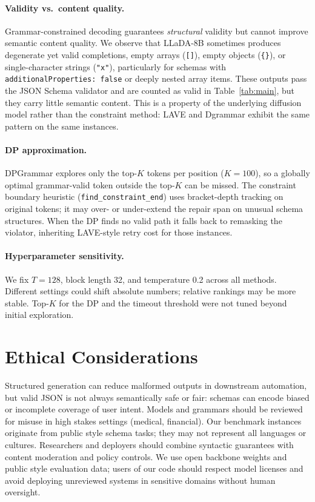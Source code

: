 \paragraph{Validity vs.\ content quality.}
Grammar-constrained decoding guarantees \emph{structural} validity but cannot improve semantic content quality.
We observe that LLaDA-8B sometimes produces degenerate yet valid completions, empty arrays (\texttt{[]}), empty objects (\texttt{\{\}}), or single-character strings (\texttt{"x"}), particularly for schemas with \texttt{additionalProperties:~false} or deeply nested array items.
These outputs pass the JSON Schema validator and are counted as valid in Table~\ref{tab:main}, but they carry little semantic content.
This is a property of the underlying diffusion model rather than the constraint method: LAVE and Dgrammar exhibit the same pattern on the same instances.

\paragraph{DP approximation.}
DPGrammar explores only the top-$K$ tokens per position ($K{=}100$), so a globally optimal grammar-valid token outside the top-$K$ can be missed.
The constraint boundary heuristic (\texttt{find\_constraint\_end}) uses bracket-depth tracking on original tokens; it may over- or under-extend the repair span on unusual schema structures.
When the DP finds no valid path it falls back to remasking the violator, inheriting LAVE-style retry cost for those instances.

\paragraph{Hyperparameter sensitivity.}
We fix $T{=}128$, block length 32, and temperature 0.2 across all methods.
Different settings could shift absolute numbers; relative rankings may be more stable.
Top-$K$ for the DP and the timeout threshold were not tuned beyond initial exploration.

\section{Ethical Considerations}

Structured generation can reduce malformed outputs in downstream automation, but valid JSON is not always semantically safe or fair: schemas can encode biased or incomplete coverage of user intent. Models and grammars should be reviewed for misuse in high stakes settings (medical, financial). Our benchmark instances originate from public style schema tasks; they may not represent all languages or cultures. Researchers and deployers should combine syntactic guarantees with content moderation and policy controls. We use open backbone weights and public style evaluation data; users of our code should respect model licenses and avoid deploying unreviewed systems in sensitive domains without human oversight.

